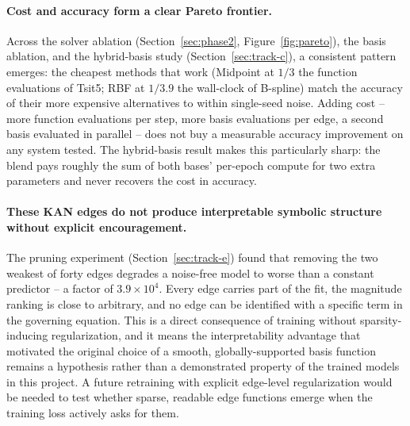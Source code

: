 \paragraph{Cost and accuracy form a clear Pareto frontier.} Across the
solver ablation (Section~\ref{sec:phase2}, Figure~\ref{fig:pareto}), the basis ablation, and the
hybrid-basis study (Section~\ref{sec:track-c}), a consistent pattern
emerges: the cheapest methods that work (Midpoint at $1/3$ the function
evaluations of Tsit5; RBF at $1/3.9$ the wall-clock of B-spline) match the
accuracy of their more expensive alternatives to within single-seed noise.
Adding cost -- more function evaluations per step, more basis evaluations per
edge, a second basis evaluated in parallel -- does not buy a measurable
accuracy improvement on any system tested. The hybrid-basis result makes this
particularly sharp: the blend pays roughly the sum of both bases' per-epoch
compute for two extra parameters and never recovers the cost in accuracy.

\paragraph{These KAN edges do not produce interpretable symbolic structure
without explicit encouragement.} The pruning experiment
(Section~\ref{sec:track-e}) found that removing the two weakest of forty edges
degrades a noise-free model to worse than a constant predictor -- a factor of
$3.9\times10^4$. Every edge carries part of the fit, the magnitude ranking
is close to arbitrary, and no edge can be identified with a specific term in
the governing equation. This is a direct consequence of training without
sparsity-inducing regularization, and it means the interpretability
advantage that motivated the original choice of a smooth, globally-supported
basis function remains a hypothesis rather than a demonstrated property of
the trained models in this project. A future retraining with explicit
edge-level regularization would be needed to test whether sparse,
readable edge functions emerge when the training loss actively asks for them.

\FloatBarrier

